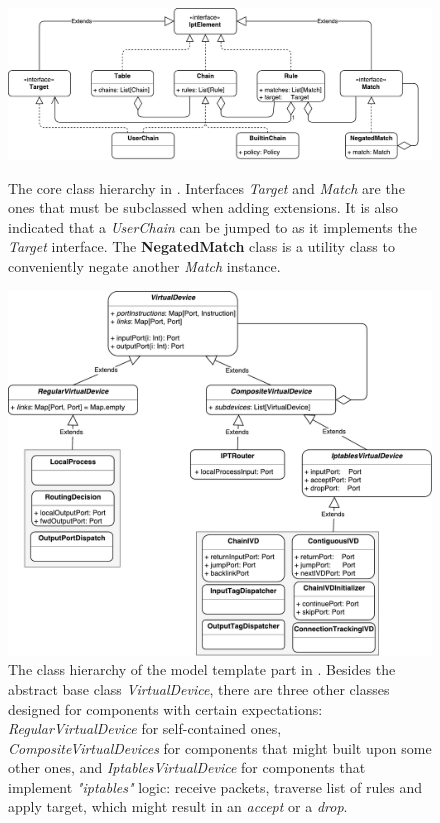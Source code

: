 \clearpage
\begin{figure}[h]
  \centering

  \includegraphics[scale=0.5]{src/img/ipt-hierarchy}
  \caption[The core class hierarchy in \TOOL.]{The core class hierarchy in
  \TOOL.  Interfaces \emph{Target} and \emph{Match} are the ones that must be
  subclassed when adding extensions.  It is also indicated that a
  \emph{UserChain} can be jumped to as it implements the \emph{Target}
  interface.  The \textbf{NegatedMatch} class is a utility class to
  conveniently negate another \emph{Match} instance.}
  \label{fig:ipt-hierarchy}

  \vspace*{\floatsep} %

  \includegraphics[scale=0.55]{src/img/virtdev-hierarchy}
  \caption[The class hierarchy of the model template part in \TOOL.]{The class
  hierarchy of the model template part in \TOOL. Besides the abstract base
  class \emph{VirtualDevice}, there are three other classes designed for
  components with certain expectations: \emph{RegularVirtualDevice} for
  self-contained ones, \emph{CompositeVirtualDevices} for components that might
  built upon some other ones, and \emph{IptablesVirtualDevice} for components
  that implement \emph{"iptables"} logic: receive packets, traverse list of
  rules and apply target, which might result in an \emph{accept} or a
  \emph{drop}.}
  \label{fig:virtdev-hierarchy}
\end{figure}
\clearpage

